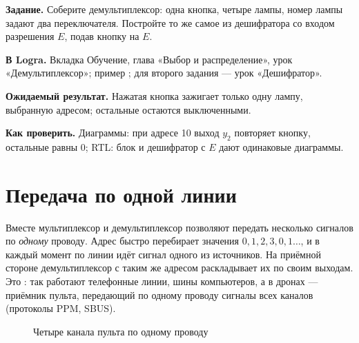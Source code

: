 \begin{diybox}[Демультиплексор]
\textbf{Задание.}  Соберите демультиплексор: одна кнопка, четыре
лампы, номер лампы задают два переключателя.  Постройте то же самое
из дешифратора со входом разрешения $E$, подав кнопку на $E$.

\textbf{В Logra.} Вкладка Обучение, глава «Выбор и распределение», урок
«Демультиплексор»; пример ; для второго задания --- урок
«Дешифратор».

\textbf{Ожидаемый результат.} Нажатая кнопка зажигает только одну лампу,
выбранную адресом; остальные остаются выключенными.

\textbf{Как проверить.} Диаграммы: при адресе 10 выход $y_2$ повторяет кнопку,
остальные равны 0; RTL: блок и дешифратор с $E$ дают одинаковые диаграммы.
\end{diybox}

\section{Передача по одной линии}

Вместе мультиплексор и демультиплексор позволяют передать несколько сигналов
по \emph{одному} проводу. Адрес быстро перебирает значения $0, 1, 2, 3, 0,
1\ldots$, и в каждый момент по линии идёт сигнал одного из источников. На
приёмной стороне демультиплексор с таким же адресом раскладывает их по своим
выходам. Это : так работают телефонные
линии, шины компьютеров, а в дронах --- приёмник пульта, передающий по одному
проводу сигналы всех каналов (протоколы PPM, SBUS).

\begin{figure}[H]
\centering
{}
\caption{Четыре канала пульта по одному проводу}
\end{figure}

